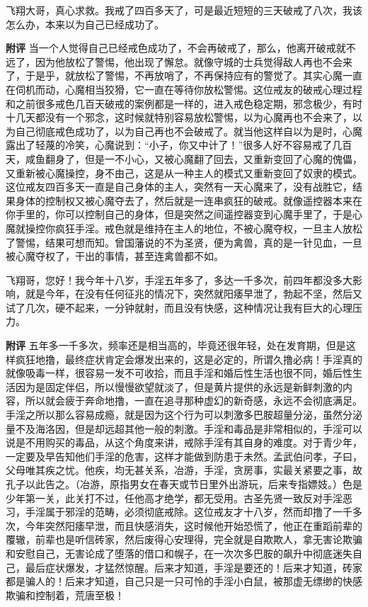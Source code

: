 \begin{case}
    飞翔大哥，真心求救。我戒了四百多天了，可是最近短短的三天破戒了八次，我该怎么办，本来以为自己已经成功了。

    \textbf{附评} 当一个人觉得自己已经戒色成功了，不会再破戒了，那么，他离开破戒就不远了，因为他放松了警惕，他出现了懈怠。就像守城的士兵觉得敌人再也不会来了，于是乎，就放松了警惕，不再放哨了，不再保持应有的警觉了。其实心魔一直在伺机而动，心魔相当狡猾，它一直在等待你放松警惕。这位戒友的破戒心理过程和之前很多戒色几百天破戒的案例都是一样的，进入戒色稳定期，邪念极少，有时十几天都没有一个邪念，这时候就特别容易放松警惕，以为心魔再也不会来了，以为自己彻底戒色成功了，以为自己再也不会破戒了。就当他这样自以为是时，心魔露出了轻蔑的冷笑，心魔说到：“小子，你又中计了！”很多人好不容易戒了几百天，咸鱼翻身了，但是一不小心，又被心魔翻了回去，又重新变回了心魔的傀儡，又重新被心魔操控，身不由己，这是从一种主人的模式又重新变回了奴隶的模式。这位戒友四百多天一直是自己身体的主人，突然有一天心魔来了，没有战胜它，结果身体的控制权又被心魔夺去了，然后就是一连串疯狂的破戒。就像遥控器本来在你手里的，你可以控制自己的身体，但是突然之间遥控器变到心魔手里了，于是心魔就操控你疯狂手淫。戒色就是维持在主人的地位，不被心魔夺权，一旦主人放松了警惕，结果可想而知。曾国藩说的不为圣贤，便为禽兽，真的是一针见血，一旦被心魔夺权了，干出的事情，甚至连禽兽都不如。
\end{case}

\begin{case}
    飞翔哥，您好！我今年十八岁，手淫五年多了，多达一千多次，前四年都没多大影响，就是今年，在没有任何征兆的情况下，突然就阳痿早泄了，勃起不坚，然后又试了几次，硬不起来，一分钟就射，而且没有快感，这种情况让我有巨大的心理压力。

    \textbf{附评} 五年多一千多次，频率还是相当高的，毕竟还很年轻，处在发育期，但是这样疯狂地撸，最终症状肯定会爆发出来的，这是必定的，所谓久撸必病！手淫真的就像吸毒一样，很容易一发不可收拾，而且手淫和婚后性生活也很不同，婚后性生活因为是固定伴侣，所以慢慢欲望就淡了，但是黄片提供的永远是新鲜刺激的内容，所以就会疲于奔命地撸，一直在追寻那种虚幻的新奇感，永远不会彻底满足。手淫之所以那么容易成瘾，就是因为这个行为可以刺激多巴胺超量分泌，虽然分泌量不及海洛因，但是却远超其他一般的刺激。手淫和毒品是非常相似的，手淫可以说是不用购买的毒品，从这个角度来讲，戒除手淫有其自身的难度。对于青少年，一定要及早告知他们手淫的危害，这样才能做到防患于未然。孟武伯问孝，子曰，父母唯其疾之忧。他疾，均无甚关系，冶游，手淫，贪房事，实最关紧要之事，故孔子以此告之。（冶游，原指男女在春天或节日里外出游玩，后来专指嫖妓。）色是少年第一关，此关打不过，任他高才绝学，都无受用。古圣先贤一致反对手淫恶习，手淫属于邪淫的范畴，必须彻底戒除。这位戒友才十八岁，然而却撸了一千多次，今年突然阳痿早泄，而且快感消失，这时候他开始恐慌了，他正在重蹈前辈的覆辙，前辈也是听信砖家，然后废得心安理得，完全就是自欺欺人，拿无害论欺骗和安慰自己，无害论成了堕落的借口和幌子，在一次次多巴胺的飙升中彻底迷失自己，最后症状爆发，才猛然惊醒。后来才知道，手淫是要还的！后来才知道，砖家都是骗人的！后来才知道，自己只是一只可怜的手淫小白鼠，被那虚无缥缈的快感欺骗和控制着，荒唐至极！
\end{case}

